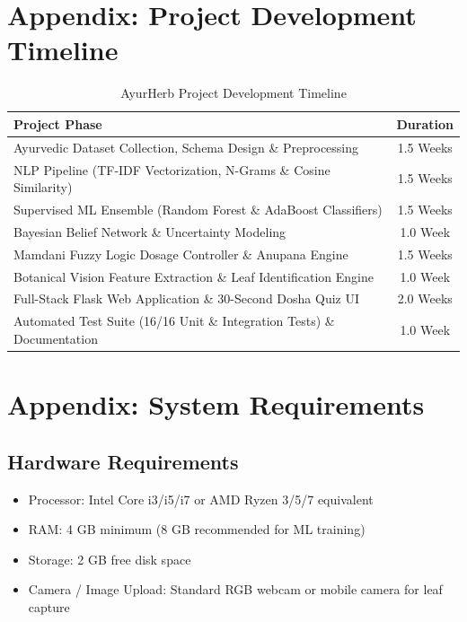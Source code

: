 \documentclass[12pt,a4paper]{article}
\begin{document}
\section*{Appendix: Project Development Timeline}

\begin{table}[H]
\centering
\caption{AyurHerb Project Development Timeline}
\label{tab:timeline}
\begin{tabular}{|l|c|}
\hline
\textbf{Project Phase} & \textbf{Duration} \\
\hline
Ayurvedic Dataset Collection, Schema Design \& Preprocessing & 1.5 Weeks \\
NLP Pipeline (TF-IDF Vectorization, N-Grams \& Cosine Similarity) & 1.5 Weeks \\
Supervised ML Ensemble (Random Forest \& AdaBoost Classifiers) & 1.5 Weeks \\
Bayesian Belief Network \& Uncertainty Modeling & 1.0 Week \\
Mamdani Fuzzy Logic Dosage Controller \& Anupana Engine & 1.5 Weeks \\
Botanical Vision Feature Extraction \& Leaf Identification Engine & 1.0 Week \\
Full-Stack Flask Web Application \& 30-Second Dosha Quiz UI & 2.0 Weeks \\
Automated Test Suite (16/16 Unit \& Integration Tests) \& Documentation & 1.0 Week \\
\hline
\end{tabular}
\end{table}

\section*{Appendix: System Requirements}

\subsection*{Hardware Requirements}
\begin{itemize}
    \item Processor: Intel Core i3/i5/i7 or AMD Ryzen 3/5/7 equivalent
    \item RAM: 4 GB minimum (8 GB recommended for ML training)
    \item Storage: 2 GB free disk space
    \item Camera / Image Upload: Standard RGB webcam or mobile camera for leaf capture
\end{itemize}
\end{document}
